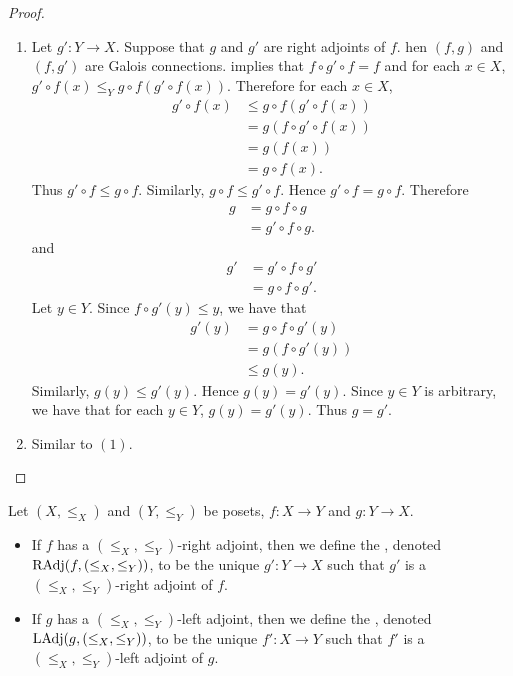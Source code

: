\documentclass{book}
\begin{document}
	\begin{proof}\
		\begin{enumerate}
			\item Let $g':Y \rightarrow X$. Suppose that $g$ and $g'$ are right adjoints of $f$. hen $(f, g)$ and $(f, g')$ are Galois connections.  implies that $f \circ g' \circ f = f$ and for each $x \in X$, $g' \circ f(x) \leq_Y g \circ f (g' \circ f(x))$. Therefore for each $x \in X$,
			\begin{align*}
				g' \circ f(x) 
				& \leq g \circ f (g' \circ f(x)) \\
				& = g (f \circ g' \circ f(x)) \\
				& = g(f(x)) \\
				& = g \circ f (x).
			\end{align*}
			Thus $g' \circ f \leq g \circ f$. Similarly, $g \circ f \leq g' \circ f$. Hence $g' \circ f = g \circ f$. Therefore 
			\begin{align*}
				g
				& = g \circ f \circ g \\
				& = g' \circ f \circ g.
			\end{align*}
			and 
			\begin{align*}
				g' 
				& = g' \circ f \circ g' \\
				& = g \circ f \circ g'. 
			\end{align*}
			Let $y \in Y$. Since $f \circ g'(y) \leq y$, we have that
			\begin{align*}
				g'(y)
				& = g \circ f \circ g' (y) \\
				& = g( f \circ g'(y)) \\
				& \leq g(y).
			\end{align*}
			Similarly, $g(y) \leq g'(y)$. Hence $g(y) = g'(y)$. Since $y \in Y$ is arbitrary, we have that for each $y \in Y$, $g(y) = g'(y)$. Thus $g = g'$. 
			\item Similar to $(1)$.
		\end{enumerate}
	\end{proof}
	
	\begin{defn} 
		Let $(X, \leq_X)$ and $(Y, \leq_Y)$ be posets, $f: X \rightarrow Y$ and $g:Y \rightarrow X$. 
		\begin{itemize}
			\item If $f$ has a $(\leq_X, \leq_Y)$-right adjoint, then we define the , denoted $\operatorname{RAdj}(f, (\leq_X, \leq_Y))$, to be the unique $g':Y \rightarrow X$ such that $g'$ is a $(\leq_X, \leq_Y)$-right adjoint of $f$. 
			\item If $g$ has a $(\leq_X, \leq_Y)$-left adjoint, then we define the \tbf{$(\leq_X, \leq_Y)$-left adjoint of $g$}, denoted $\operatorname{LAdj}(g, (\leq_X, \leq_Y))$, to be the unique $f':X \rightarrow Y$ such that $f'$ is a $(\leq_X, \leq_Y)$-left adjoint of $g$. 
		\end{itemize}
	\end{defn}
	
\end{document}
